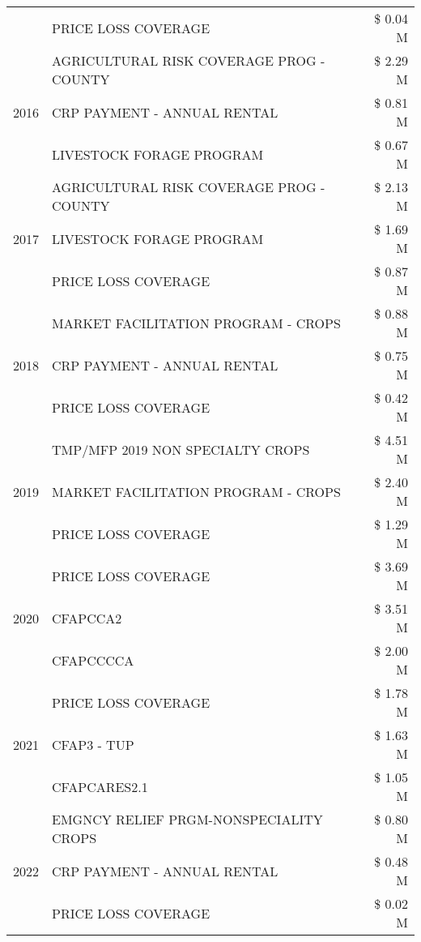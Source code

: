 \begin{tabular}{llr}
 & PRICE LOSS COVERAGE & \$ 0.04 M \\
\cline{1-3}
\multirow[t]{3}{*}{2016} & AGRICULTURAL RISK COVERAGE PROG - COUNTY & \$ 2.29 M \\
 & CRP PAYMENT - ANNUAL RENTAL & \$ 0.81 M \\
 & LIVESTOCK FORAGE PROGRAM & \$ 0.67 M \\
\cline{1-3}
\multirow[t]{3}{*}{2017} & AGRICULTURAL RISK COVERAGE PROG - COUNTY & \$ 2.13 M \\
 & LIVESTOCK FORAGE PROGRAM & \$ 1.69 M \\
 & PRICE LOSS COVERAGE & \$ 0.87 M \\
\cline{1-3}
\multirow[t]{3}{*}{2018} & MARKET FACILITATION PROGRAM - CROPS & \$ 0.88 M \\
 & CRP PAYMENT - ANNUAL RENTAL & \$ 0.75 M \\
 & PRICE LOSS COVERAGE & \$ 0.42 M \\
\cline{1-3}
\multirow[t]{3}{*}{2019} & TMP/MFP 2019 NON SPECIALTY CROPS & \$ 4.51 M \\
 & MARKET FACILITATION PROGRAM - CROPS & \$ 2.40 M \\
 & PRICE LOSS COVERAGE & \$ 1.29 M \\
\cline{1-3}
\multirow[t]{3}{*}{2020} & PRICE LOSS COVERAGE & \$ 3.69 M \\
 & CFAPCCA2 & \$ 3.51 M \\
 & CFAPCCCCA & \$ 2.00 M \\
\cline{1-3}
\multirow[t]{3}{*}{2021} & PRICE LOSS COVERAGE & \$ 1.78 M \\
 & CFAP3 - TUP & \$ 1.63 M \\
 & CFAPCARES2.1 & \$ 1.05 M \\
\cline{1-3}
\multirow[t]{3}{*}{2022} & EMGNCY RELIEF PRGM-NONSPECIALITY CROPS & \$ 0.80 M \\
 & CRP PAYMENT - ANNUAL RENTAL & \$ 0.48 M \\
 & PRICE LOSS COVERAGE & \$ 0.02 M \\
\cline{1-3}
\bottomrule
\end{tabular}
